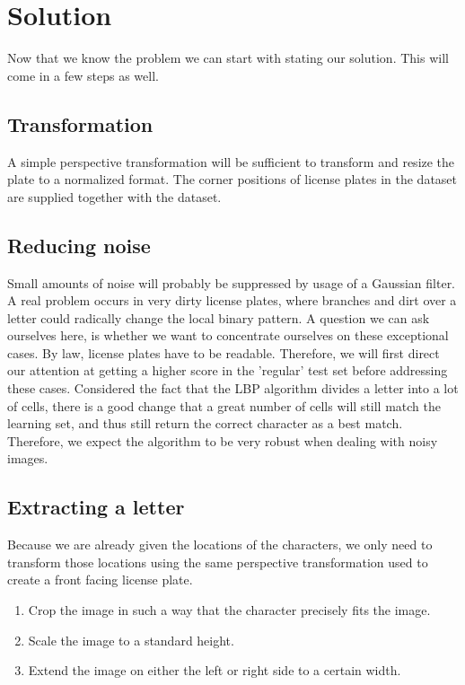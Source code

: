 \documentclass[a4paper]{article}
\begin{document}
\section{Solution}

Now that we know the problem we can start with stating our solution. This will
come in a few steps as well.

\subsection{Transformation}

A simple perspective transformation will be sufficient to transform and resize
the plate to a normalized format. The corner positions of license plates in the
dataset are supplied together with the dataset.

\subsection{Reducing noise}

Small amounts of noise will probably be suppressed by usage of a Gaussian
filter. A real problem occurs in very dirty license plates, where branches and
dirt over a letter could radically change the local binary pattern. A question
we can ask ourselves here, is whether we want to concentrate ourselves on these
exceptional cases. By law, license plates have to be readable. Therefore, we
will first direct our attention at getting a higher score in the 'regular' test
set before addressing these cases. Considered the fact that the LBP algorithm
divides a letter into a lot of cells, there is a good change that a great
number of cells will still match the learning set, and thus still return the
correct character as a best match. Therefore, we expect the algorithm to be
very robust when dealing with noisy images.

\subsection{Extracting a letter}

Because we are already given the locations of the characters, we only need to
transform those locations using the same perspective transformation used to
create a front facing license plate.

\begin{enumerate}
    \item Crop the image in such a way that the character precisely fits the
          image.
    \item Scale the image to a standard height.
    \item Extend the image on either the left or right side to a certain width.
\end{enumerate}
\end{document}
